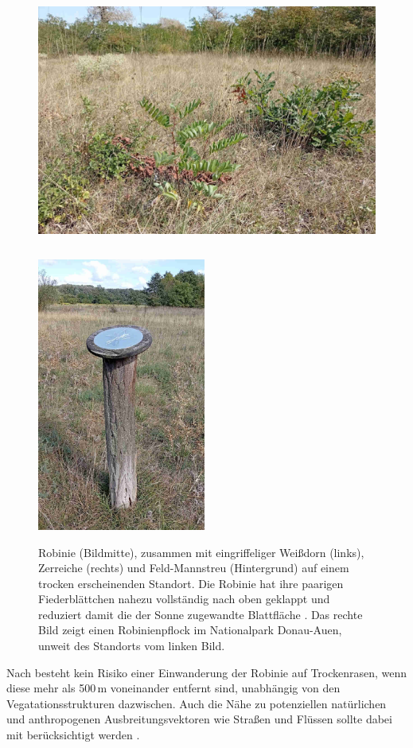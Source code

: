 \documentclass[twocolumn]{scrartcl}
\begin{document}
\begin{figure}[htbp]
  \centering
  \includegraphics[height=9cm]{./bild/feldmannstreu2}
  \includegraphics[height=9cm]{./bild/robPflockNP}
  \caption{Robinie (Bildmitte), zusammen mit eingriffeliger Weißdorn (links), Zerreiche (rechts) und Feld-Mannstreu (Hintergrund) auf einem trocken erscheinenden Standort. Die Robinie hat ihre paarigen Fiederblättchen nahezu vollständig nach oben geklappt und reduziert damit die der Sonne zugewandte Blattfläche \citep{schildknecht1984blattbewegung}. Das rechte Bild zeigt einen Robinienpflock im Nationalpark Donau-Auen, unweit des Standorts vom linken Bild.}
  \label{fig:feldmannstreu}
\end{figure}

Nach \citet[S.~134]{landeck2022robinie} besteht kein Risiko einer
Einwanderung der Robinie auf Trockenrasen, wenn diese mehr als 500\,m
voneinander entfernt sind, unabhängig von den Vegatationsstrukturen
dazwischen. Auch die Nähe zu potenziellen natürlichen und
anthropogenen Ausbreitungsvektoren wie Straßen und Flüssen sollte
dabei mit berücksichtigt werden \citep{skowronek2020robinieNaturschutz}.
\end{document}
